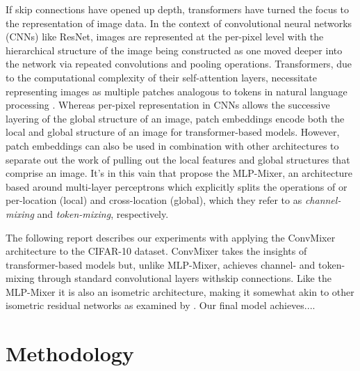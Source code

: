 \documentclass[letterpaper]{article} %
\begin{document}
If skip connections have opened up depth, transformers have turned the focus to the representation of image data. In the context of convolutional neural networks (CNNs) like ResNet, images are represented at the per-pixel level with the hierarchical structure of the image being constructed as one moved deeper into the network via repeated convolutions and pooling operations. Transformers, due to the computational complexity of their self-attention layers, necessitate representing images as multiple patches analogous to tokens in natural language processing \citep{Dosovitskiy2020}. Whereas per-pixel representation in CNNs allows the successive layering of the global structure of an image, patch embeddings encode both the local and global structure of an image for transformer-based models. However, patch embeddings can also be used in combination with other architectures to separate out the work of pulling out the local features and global structures that comprise an image. It's in this vain that \citet{Tolstikhin2021} propose the MLP-Mixer, an architecture based around multi-layer perceptrons which explicitly splits the operations of or per-location (local) and cross-location (global), which they refer to as \textit{channel-mixing} and \textit{token-mixing}, respectively. 

The following report describes our experiments with applying the ConvMixer architecture to the CIFAR-10 dataset\citep{Krizhevsky2009LearningML}. ConvMixer takes the insights of transformer-based models but, unlike MLP-Mixer, achieves channel- and token-mixing through standard convolutional layers withskip connections. Like the MLP-Mixer it is also an isometric architecture, making it somewhat akin to other isometric residual networks as examined by \citet{Sandler2019}. Our final model achieves....

\section{Methodology}
\end{document}
